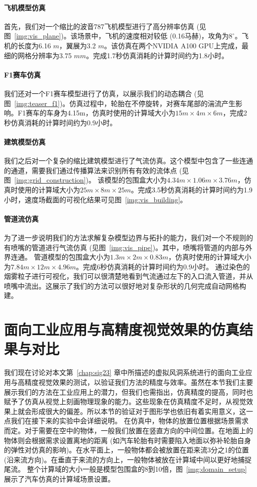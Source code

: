 \paragraph{飞机模型仿真}
首先，我们对一个缩比的波音787飞机模型进行了高分辨率仿真 (见图~\ref{img:vis_plane})。该场景中，飞机的速度相对较低 (0.16马赫)，攻角为$8^{\circ}$。飞机的长度为6.16 $m$，翼展为3.2 $m$。该仿真在两个NVIDIA A100 GPU上完成，最细的网格分辨率为3.75 $mm$。完成1.7秒仿真消耗的计算时间约为1.8小时。

\paragraph{F1赛车仿真}
我们还对一个F1赛车模型进行了仿真，以展示我们的动态耦合 (见图~\ref{img:teaser_f1})。仿真过程中，轮胎在不停旋转，对赛车尾部的湍流产生影响。F1赛车的车身为4.15m，仿真时使用的计算域大小为$15m\!\times\!4m\!\times\!6m$，完成2秒仿真消耗的计算时间约为0.9小时。

\paragraph{建筑模型仿真}
我们之后对一个复杂的缩比建筑模型进行了气流仿真。这个模型中包含了一些连通的通道，需要我们通过传播算法来识别所有有效的流体点 (见图~\ref{img:grid_construction})。
该模型的包围盒大小为$4.34m\!\times\!1.06m\!\times\!3.76m$，仿真时使用的计算域大小为$25m\!\times\!8m\!\times\!25m$。完成3.5秒仿真消耗的计算时间约为1.9小时，速度场截面的可视化结果可见图~\ref{img:vis_building}。

\paragraph{管道流仿真}
为了进一步说明我们的方法求解复杂模型边界与拓扑的能力，我们对一个不规则的有喷嘴的管道进行气流仿真 (见图~\ref{img:vis_pipe})。其中，喷嘴将管道的内部与外界连通。
管道模型的包围盒大小为$1.3m\!\times\!2m\!\times\!0.83m$，仿真时使用的计算域大小为$7.84m\!\times\!12m\!\times\!4.96m$。完成6秒仿真消耗的计算时间约为0.9小时。
通过染色的烟雾粒子进行可视化，我们可以很清楚地看到气流通过左下的入口流入管道，并从喷嘴中流出。这展示了我们的方法可以很好地对复杂形状的几何完成自动网格构建。

\section{面向工业应用与高精度视觉效果的仿真结果与对比}
\label{sec:result_industrial}
我们现在讨论对本文第~\ref{chap:sig23} 章中所描述的虚拟风洞系统进行的面向工业应用与高精度视觉效果的测试，以验证我们方法的精度与效率。虽然在本节我们主要展示我们的方法在工业应用上的潜力，但我们也需指出，仿真精度的提高，同时也赋予了仿真从视觉上刻画物理现象的能力。这些现象在仿真精度不足时，从视觉效果上就会形成很大的偏差。所以本节的验证对于图形学也依旧有着实用意义，这一点我们在接下来的实验中会详细说明。
在仿真中，物体的放置位置根据场景需求而定。对于需要在空中的物体，一般我们放置在竖直方向的中间位置。在地面上的物体则会根据需求设置离地的距离 (如汽车轮胎有时需要陷入地面以弥补轮胎自身的弹性对仿真的影响)。在水平面上，一般物体都会被放置在距来流3分之1的位置 (沿来流方向)。在垂直于来流的方向上，一般物体被放在计算域中间以更好地捕捉尾流。
整个计算域的大小一般是模型包围盒的8到10倍，图~\ref{img:domain_setup} 展示了汽车仿真的计算域场景设置。

